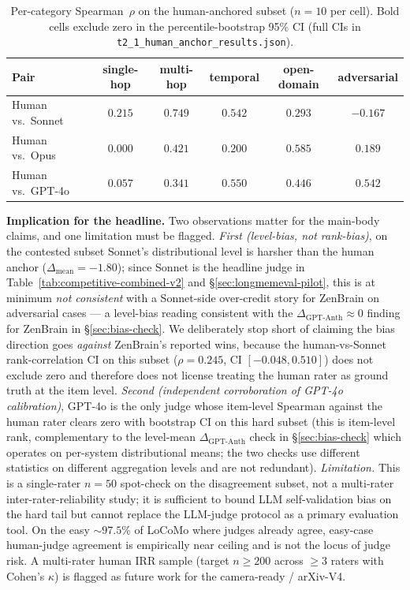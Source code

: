 \documentclass{article}
\begin{document}
\begin{table}[h]
\centering
\footnotesize
\begin{tabular}{lccccc}
\toprule
Pair & single-hop & multi-hop & temporal & open-domain & adversarial \\
\midrule
Human vs.\ Sonnet & $0.215$ & $\mathbf{0.749}$ & $0.542$ & $0.293$ & $-0.167$ \\
Human vs.\ Opus   & $0.000$ & $0.421$ & $0.200$ & $\mathbf{0.585}$ & $0.189$ \\
Human vs.\ GPT-4o & $0.057$ & $0.341$ & $\mathbf{0.550}$ & $0.446$ & $\mathbf{0.542}$ \\
\bottomrule
\end{tabular}
\caption{Per-category Spearman~$\rho$ on the human-anchored
subset ($n{=}10$ per cell). Bold cells exclude zero in the
percentile-bootstrap 95\% CI (full CIs in
\texttt{t2\_1\_human\_anchor\_results.json}).}
\label{tab:human-anchor-percat}
\end{table}

\textbf{Implication for the headline.} Two observations matter for
the main-body claims, and one limitation must be flagged.
\emph{First (level-bias, not rank-bias)}, on the contested subset
Sonnet's distributional level is harsher than the human anchor
($\Delta_{\text{mean}}{=}{-}1.80$); since Sonnet is the headline
judge in Table~\ref{tab:competitive-combined-v2} and
\S\ref{sec:longmemeval-pilot}, this is at minimum
\emph{not consistent} with a Sonnet-side over-credit story for
ZenBrain on adversarial cases --- a level-bias reading consistent
with the $\Delta_{\text{GPT-Anth}} \approx 0$ finding for ZenBrain
in \S\ref{sec:bias-check}. We deliberately stop short of claiming
the bias direction goes \emph{against} ZenBrain's reported wins,
because the human-vs-Sonnet rank-correlation CI on this subset
($\rho{=}0.245$, CI $[-0.048, 0.510]$) does not exclude zero and
therefore does not license treating the human rater as ground truth
at the item level.
\emph{Second (independent corroboration of GPT-4o calibration)},
GPT-4o is the only judge whose item-level Spearman against the
human rater clears zero with bootstrap CI on this hard subset
(this is item-level rank, complementary to the level-mean
$\Delta_{\text{GPT-Anth}}$ check in \S\ref{sec:bias-check} which
operates on per-system distributional means; the two checks use
different statistics on different aggregation levels and are not
redundant).
\emph{Limitation.} This is a single-rater $n{=}50$ spot-check on
the disagreement subset, not a multi-rater inter-rater-reliability
study; it is sufficient to bound LLM self-validation bias on the
hard tail but cannot replace the LLM-judge protocol as a primary
evaluation tool. On the easy $\sim\!97.5\%$ of LoCoMo where judges
already agree, easy-case human-judge agreement is empirically near
ceiling and is not the locus of judge risk. A multi-rater human IRR
sample (target $n{\geq}200$ across $\geq 3$ raters with Cohen's
$\kappa$) is flagged as future work for the camera-ready /
arXiv-V4.
\end{document}
